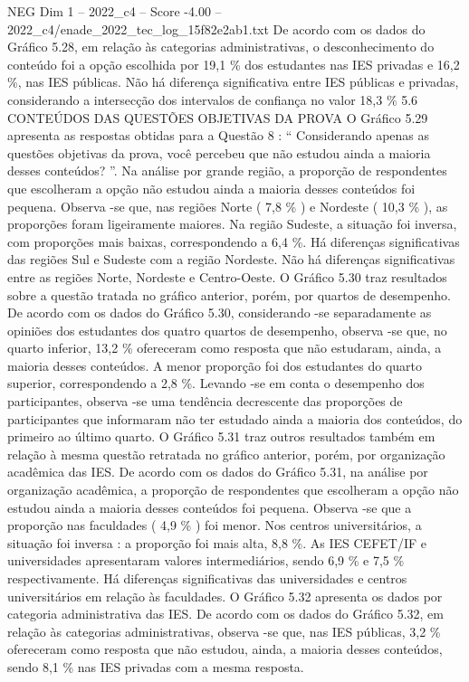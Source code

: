 \begin{textsample}{NEG Dim 1 – 2022\_c4 – Score -4.00 – 2022\_c4/enade\_2022\_tec\_log\_15f82e2ab1.txt}
De acordo com os dados do Gráfico 5.28, em relação às categorias administrativas, o desconhecimento do conteúdo foi a opção escolhida por 19,1 \% dos estudantes nas IES privadas e 16,2 \%, nas IES públicas.
Não há diferença significativa entre IES públicas e privadas, considerando a intersecção dos intervalos de confiança no valor 18,3 \% 5.6 CONTEÚDOS DAS QUESTÕES OBJETIVAS DA PROVA O Gráfico 5.29 apresenta as respostas obtidas para a Questão 8 : “ Considerando apenas as questões objetivas da prova, você percebeu que não estudou ainda a maioria desses conteúdos? ”.
Na análise por grande região, a proporção de respondentes que escolheram a opção não estudou ainda a maioria desses conteúdos foi pequena.
Observa -se que, nas regiões Norte ( 7,8 \% ) e Nordeste ( 10,3 \% ), as proporções foram ligeiramente maiores.
Na região Sudeste, a situação foi inversa, com proporções mais baixas, correspondendo a 6,4 \%.
Há diferenças significativas das regiões Sul e Sudeste com a região Nordeste.
Não há diferenças significativas entre as regiões Norte, Nordeste e Centro-Oeste.
O Gráfico 5.30 traz resultados sobre a questão tratada no gráfico anterior, porém, por quartos de desempenho.
De acordo com os dados do Gráfico 5.30, considerando -se separadamente as opiniões dos estudantes dos quatro quartos de desempenho, observa -se que, no quarto inferior, 13,2 \% ofereceram como resposta que não estudaram, ainda, a maioria desses conteúdos.
A menor proporção foi dos estudantes do quarto superior, correspondendo a 2,8 \%.
Levando -se em conta o desempenho dos participantes, observa -se uma tendência decrescente das proporções de participantes que informaram não ter estudado ainda a maioria dos conteúdos, do primeiro ao último quarto.
O Gráfico 5.31 traz outros resultados também em relação à mesma questão retratada no gráfico anterior, porém, por organização acadêmica das IES.
De acordo com os dados do Gráfico 5.31, na análise por organização acadêmica, a proporção de respondentes que escolheram a opção não estudou ainda a maioria desses conteúdos foi pequena.
Observa -se que a proporção nas faculdades ( 4,9 \% ) foi menor.
Nos centros universitários, a situação foi inversa : a proporção foi mais alta, 8,8 \%.
As IES CEFET/IF e universidades apresentaram valores intermediários, sendo 6,9 \% e 7,5 \% respectivamente.
Há diferenças significativas das universidades e centros universitários em relação às faculdades.
O Gráfico 5.32 apresenta os dados por categoria administrativa das IES.
De acordo com os dados do Gráfico 5.32, em relação às categorias administrativas, observa -se que, nas IES públicas, 3,2 \% ofereceram como resposta que não estudou, ainda, a maioria desses conteúdos, sendo 8,1 \% nas IES privadas com a mesma resposta.

\end{textsample}
